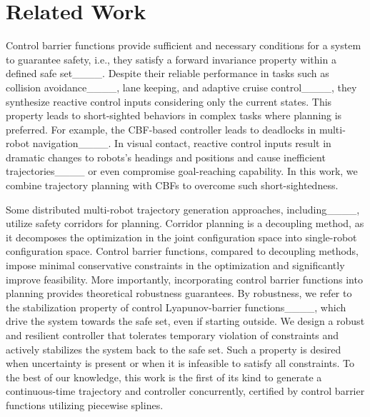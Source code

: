 \section{Related Work}
Control barrier functions provide sufficient and necessary conditions for a system to guarantee safety, i.e., they satisfy a forward invariance property within a defined safe set____. Despite their reliable performance in tasks such as collision avoidance____, lane keeping, and adaptive cruise control____, they synthesize reactive control inputs considering only the current states. This property leads to short-sighted behaviors in complex tasks where planning is preferred. For example, the CBF-based controller leads to deadlocks in multi-robot navigation____. In visual contact, reactive control inputs result in dramatic changes to robots's headings and positions and cause inefficient trajectories____ or even compromise goal-reaching capability. 
In this work, we combine trajectory planning with CBFs to overcome such short-sightedness.%

Some distributed multi-robot trajectory generation approaches, including____, utilize safety corridors for planning. Corridor planning is a decoupling method, as it decomposes the optimization in the joint configuration space into single-robot configuration space. Control barrier functions, compared to  decoupling methods, impose minimal conservative constraints in the optimization and significantly improve  feasibility. More importantly, incorporating control barrier functions into planning provides theoretical robustness guarantees. By robustness, we refer to the stabilization property of control Lyapunov-barrier functions____, which drive the system towards the safe set, even if starting outside. We design a robust and resilient controller that tolerates temporary violation of constraints and actively stabilizes the system back to the safe set. Such a property is desired when uncertainty is present or when it is infeasible to satisfy all constraints. To the best of our knowledge, this work is the first of its kind to generate a continuous-time trajectory and controller concurrently, certified by control barrier functions utilizing piecewise splines.


